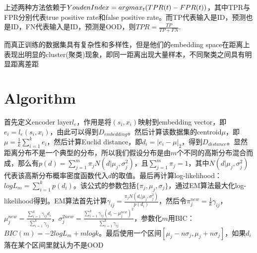 \documentclass[a4paper,12pt]{article}
\begin{document}
上述两种方法依赖于$Youden\space Index = arg\space max_{t}(TPR(t)-FPR(t))$，其中TPR与FPR分别代表true positive rate和false positive rate。而TP代表输入是ID，预测也是ID，FN代表输入是ID，预测是OOD，则$TPR = \frac{TP}{TP + FN}$.

而真正训练的数据集具有复杂性和多样性，但是他们的embedding space在距离上表现出明显的cluster(聚类)现象，即同一距离出现大量样本，不同聚类之间具有明显距离差距

\section{Algorithm}
首先定义encoder layer$l_e$，作用是将$(s_i, x_i)$映射到embedding vector，即$e_i = l_e(s_i, x_i)$，由此可以得到$D_{embedding}$。然后计算该数据集的centroid$\mu$，即$\mu = \frac{1}{k}\sum_{i=1}^{k}e_i$，然后计算Euclid distance，即$d_i = |e_i - \mu|_2$，得到$D_{distance}$。显然距离分布不是一个典型的分布，所以我们假设分布是由$m$个不同的高斯分布混合而成，那么有$p(d) = \sum_{j=1}^{m}\pi_jN(d|\mu_j, \sigma_j^2)$，且$\sum_{j=1}^{m}\pi_j = 1$，其中$N(d|\mu_j, \sigma_j^2)$代表该高斯分布概率密度函数代入$d$的取值。最后再计算log-likelihood：$logL_m = \sum_{i=1}^{k}p(d_i)$。该公式的参数包括$\{\pi_j, \mu_j, \sigma_j\}$，通过EM算法最大化log-likelihood得到。EM算法首先计算$\gamma_{ij} = \frac{\pi_jN(d_i|\mu_j, \sigma_j^2)}{p(d_i)}$，然后令$\pi_j^{new} = \frac{1}{k}\gamma_{ij}$，$\mu_j^{new} = \frac{\sum_{i=1}^{k}\gamma_{ij}d_i}{\sum_{i=1}^{k}\gamma_{ij}}$，$\sigma_j^{2 new} = \frac{\sum_{i=1}^{k}\gamma_{ij}(d_i - \mu_j^{new})^2}{\sum_{i=1}^{k}\gamma_{ij}}$，参数化$m$用BIC：$BIC(m) = -2logL_m + mlogk$。最后使用一个区间$[\mu_j - n\sigma_j, \mu_j + n\sigma_j]$，如果$d_i$落在某个区间里就认为不是OOD
\end{document}
